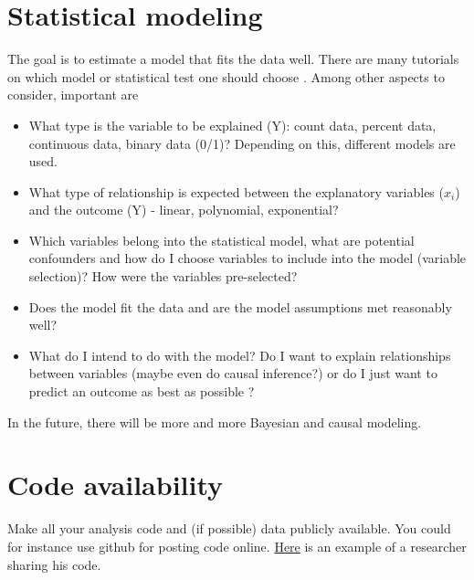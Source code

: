 \documentclass[12pt,a4paper]{article}
\begin{document}
\section{Statistical modeling}
The goal is to estimate a model that fits the data well. There are many tutorials on which model or statistical test one should choose \cite{Parab2010ChoosingST} \cite{Abdi2023}. Among other aspects to consider, important are
\begin{itemize}
\item What type is the variable to be explained (Y): count data, percent data, continuous data, binary data (0/1)? Depending on this, different models are used.
\item What type of relationship is expected between the explanatory variables ($x_i$) and the outcome (Y) - linear, polynomial, exponential?
\item Which variables belong into the statistical model, what are potential confounders and how do I choose variables to include into the model (variable selection)? How were the variables pre-selected?
\item Does the model fit the data and are the model assumptions met reasonably well? 
\item What do I intend to do with the model? Do I want to explain relationships between variables (maybe even do causal inference?) or do I just want to predict an outcome as best as possible \cite{shmueli2010explain}?
\end{itemize}

In the future, there will be more and more Bayesian and causal modeling.

\section{Code availability}
Make all your analysis code and (if possible) data publicly available. You could for instance use github for posting code online. \href{https://osf.io/tf5xu/?view_only=}{Here}  is an example of a researcher sharing his code.

\newpage


%
%

\end{document}
